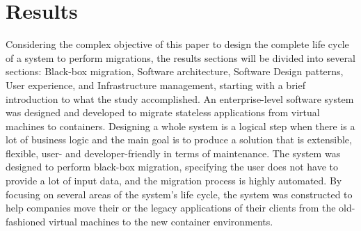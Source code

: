 \documentclass[twocolumn]{article}
\begin{document}
\section{Results}
Considering the complex objective of this paper to design the complete life cycle of a system to perform migrations, the results sections will be divided into several sections:  Black-box migration, Software architecture, Software Design patterns, User experience, and Infrastructure management, starting with a brief introduction to what the study accomplished. An enterprise-level software system was designed and developed to migrate stateless applications from virtual machines to containers. Designing a whole system is a logical step when there is a lot of business logic and the main goal is to produce a solution that is extensible, flexible, user- and developer-friendly in terms of maintenance. The system was designed to perform black-box migration, specifying the user does not have to provide a lot of input data, and the migration process is highly automated. By focusing on several areas of the system's life cycle, the system was constructed to help companies move their or the legacy applications of their clients from the old-fashioned virtual machines to the new container environments.
\end{document}
